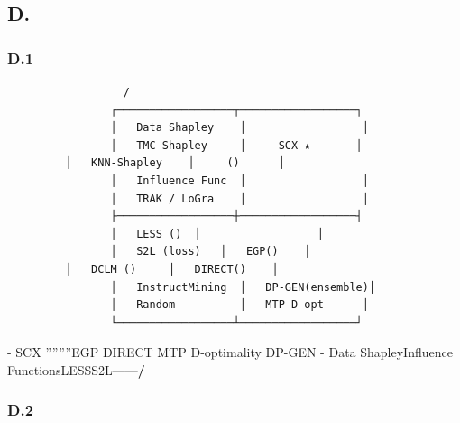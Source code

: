 \documentclass[
  12pt,
]{article}
\begin{document}
\subsection{D.
}\label{d.-ux7adeux4e89ux683cux5c40ux603bux7ed3}

\subsubsection{D.1
}\label{d.1-ux56dbux8c61ux9650ux5b9aux4f4dux56feux6587ux672cux63cfux8ff0}

\begin{verbatim}
                  /                  
                ┌──────────────────┬──────────────────┐
                │   Data Shapley    │                  │
                │   TMC-Shapley     │     SCX ★       │
         │   KNN-Shapley    │     ()      │
                │   Influence Func  │                  │
                │   TRAK / LoGra    │                  │
                ├──────────────────┼──────────────────┤
                │   LESS ()  │                  │
                │   S2L (loss)   │   EGP()    │
         │   DCLM ()     │   DIRECT()    │
                │   InstructMining  │   DP-GEN(ensemble)│
                │   Random          │   MTP D-opt      │
                └──────────────────┴──────────────────┘
\end{verbatim}

\textbf{} - \textbf{} SCX
''''''''EGP DIRECT
 MTP  D-optimality DP-GEN  -
\textbf{}Data ShapleyInfluence
FunctionsLESSS2L------\textbf{/}

\subsubsection{D.2
}\label{d.2-ux5404ux65b9ux6cd5ux8986ux76d6ux7684ux529fux80fdux77e9ux9635}
\end{document}
